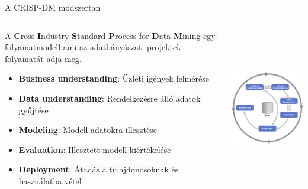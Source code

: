 \documentclass[english, aspectratio=169]{beamer}
\begin{document}
\begin{frame}{A CRISP-DM módszertan}
\begin{columns}
\begin{column}{.5\textwidth}
A \textbf{C}ross \textbf{I}ndustry \textbf{S}tandard \textbf{P}rocess for \textbf{D}ata \textbf{M}ining egy folyamatmodell ami az
adatbányászati projektek folyamatát adja meg.
\begin{itemize}
	\item \textbf{Business understanding}: Üzleti igények felmérése
	\item \textbf{Data understanding}: Rendelkezésre álló adatok gyűjtése
	\item \textbf{Modeling}: Modell adatokra illesztése
	\item \textbf{Evaluation}: Illesztett modell kiértékelése
	\item \textbf{Deployment}: Átadás a tulajdonosoknak és használatba vétel
\end{itemize}
\end{column}
\begin{column}{.5\textwidth}
\begin{center}
\includegraphics[width=7cm, height=7cm, keepaspectratio]{images/regresszio_3.png}
\end{center}
\end{column}
\end{columns}
\end{frame}
\end{document}
